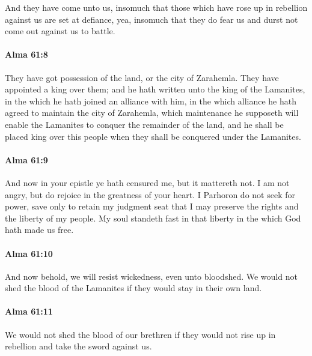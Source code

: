 			And they have come unto us,
			insomuch that those which have rose up in rebellion against us
			are set at defiance,
			yea, insomuch that they do fear us
			and durst not come out against us to battle.

		\paragraph{Alma 61:8} %
			\label{ALMA-61-8}

			They have got possession of the land, or the city of Zarahemla.
			They have appointed a king over them;
			and he hath written unto the king of the Lamanites,
			in the which he hath joined an alliance with him,
			in the which alliance he hath agreed to maintain the city of Zarahemla,
			which maintenance he supposeth will enable
			the Lamanites to conquer the remainder of the land,
			and he shall be placed king over this people
			when they shall be conquered under the Lamanites.

		\paragraph{Alma 61:9} %
			\label{ALMA-61-9}

			And now in your epistle ye hath censured me,
			but it mattereth not.
			I am not angry, but do rejoice in the greatness of your heart.
			I Parhoron do not seek for power, save only to retain my judgment seat
			that I may preserve the rights and the liberty of my people.
			My soul standeth fast in that liberty in the which God hath made us free.

		\paragraph{Alma 61:10} %
			\label{ALMA-61-10}

			And now behold, we will resist wickedness, even unto bloodshed.
			We would not shed the blood of the Lamanites
			if they would stay in their own land.

		\paragraph{Alma 61:11} %
			\label{ALMA-61-11}

			We would not shed the blood of our brethren
			if they would not rise up in rebellion and take the sword against us.

